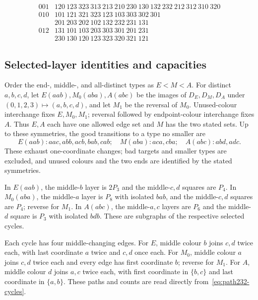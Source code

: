 \documentclass[11pt]{article}
\numberwithin{equation}{section}
\numberwithin{table}{section}
\begin{document}
\begin{equation}
\label{eq:path232-cycles}
\begin{array}{c|l}
001&120\ 123\ 323\ 313\ 213\ 210\ 230\ 130\ 132\ 232\ 212\ 312\ 310\ 320\\[2pt]
010&101\ 121\ 321\ 323\ 123\ 103\ 303\ 302\ 301\\
   &201\ 203\ 202\ 102\ 132\ 232\ 231\ 131\\[2pt]
012&131\ 101\ 103\ 203\ 303\ 301\ 201\ 231\\
   &230\ 130\ 120\ 123\ 323\ 320\ 321\ 121
\end{array}
\end{equation}

\subsection{Selected-layer identities and capacities}
Order the end-, middle-, and all-distinct types as $E<M<A$.
For distinct $a,b,c,d$, let $E(aab),M_0(aba),A(abc)$ be the images of
$D_E,D_M,D_A$ under $(0,1,2,3)\mapsto(a,b,c,d)$, and let $M_1$ be
the reversal of $M_0$. Unused-colour interchange fixes $E,M_0,M_1$;
reversal followed by endpoint-colour interchange fixes $A$. Thus
$E,A$ each have one allowed edge set and $M$ has the two stated sets.
Up to these symmetries, the good transitions to a type no smaller are
\[
E(aab):aac,abb,acb,bab,cab;\quad
M(aba):aca,cba;\quad A(abc):abd,adc.
\]
These exhaust one-coordinate changes; bad targets and smaller types
are excluded, and unused colours and the two ends are identified
by the stated symmetries.

In $E(aab)$, the middle-$b$ layer is $2P_3$ and the middle-$c,d$
squares are $P_4$. In $M_0(aba)$, the middle-$a$ layer is $P_8$
with isolated $bab$, and the middle-$c,d$ squares are $P_4$;
reverse for $M_1$. In $A(abc)$, the middle-$a,c$ layers are $P_6$
and the middle-$d$ square is $P_3$ with isolated $bdb$.
These are subgraphs of the respective selected cycles.

Each cycle has four middle-changing edges. For $E$, middle colour $b$
joins $c,d$ twice each, with last coordinate $a$ twice and $c,d$
once each. For $M_0$, middle colour $a$ joins $c,d$ twice each and
every edge has first coordinate $b$; reverse for $M_1$. For $A$,
middle colour $d$ joins $a,c$ twice each, with first coordinate in
$\{b,c\}$ and last coordinate in $\{a,b\}$. These paths and counts
are read directly from~\eqref{eq:path232-cycles}.
\end{document}
